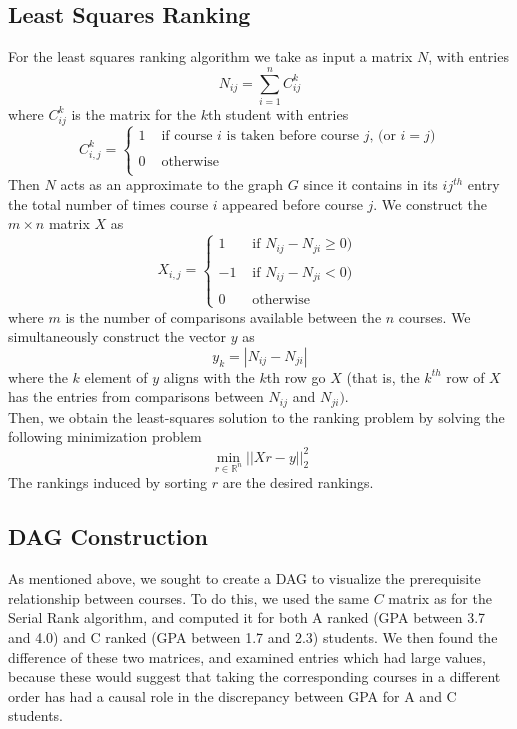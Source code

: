 \documentclass[10pt]{siamltex}
\begin{document}
\begin{pagewiselinenumbers}
\subsection{Least Squares Ranking}
For the least squares ranking algorithm we take as input a matrix $N$, with entries $$N_{ij} = \sum_{i = 1}^n C^k_{ij}$$
where $C^k_{ij}$ is the matrix for the $k$th student with entries
\begin{equation}
C^k_{i,j} = \left\{
	\begin{array}{rl}
 1 & \text{ if course $i$ is taken before course $j$, (or $i=j$)} 	\\
 &  \\
 0 & \text{ otherwise }	\\
     \end{array}
   \right.
\label{comparisonMatrix2}
\end{equation}
Then $N$ acts as an approximate to the graph $G$ since it contains in its $ij^{th}$ entry the total number of times course $i$ appeared before course $j$. We construct the $m \times n$ matrix $X$ as
\begin{equation}
X_{i,j} = \left\{
	\begin{array}{rl}
 1 & \text{ if $N_{ij} - N_{ji} \geq 0$)} 	\\
 &  \\
 -1 & \text{ if $N_{ij} - N_{ji} < 0$) }	\\
& \\
0 & \text{ otherwise}
     \end{array}
   \right.
\label{comparisonMatrix3}
\end{equation}
where $m$ is the number of comparisons available between the $n$ courses. We simultaneously construct the vector $y$ as 
$$y_k = \left|N_{ij} - N_{ji}\right|$$
where the $k$ element of $y$ aligns with the $k$th row go $X$ (that is, the $k^{th}$ row of $X$ has the entries from comparisons between $N_{ij}$ and $N_{ji})$.\\
Then, we obtain the least-squares solution to the ranking problem by solving the following minimization problem $$\min_{r \in \mathbb{R}^n} ||Xr - y||_2^2$$
The rankings induced by sorting $r$ are the desired rankings.
\subsection{DAG Construction}
As mentioned above, we sought to create a DAG to visualize the prerequisite relationship between courses. To do this, we used the same $C$ matrix as for the Serial Rank algorithm, and computed it for both A ranked (GPA between 3.7 and 4.0) and C ranked (GPA between 1.7 and 2.3) students. We then found the difference of these two matrices, and examined entries which had large values, because these would suggest that taking the corresponding courses in a different order has had a causal role in the discrepancy between GPA for A and C students.


\end{pagewiselinenumbers}
\end{document}
